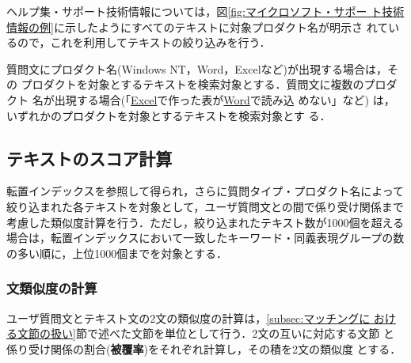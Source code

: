 ヘルプ集・サポート技術情報については，図\ref{fig:マイクロソフト・サポー
ト技術情報の例}に示したようにすべてのテキストに対象プロダクト名が明示さ
れているので，これを利用してテキストの絞り込みを行う．

質問文にプロダクト名(Windows NT，Word，Excelなど)が出現する場合は，その
プロダクトを対象とするテキストを検索対象とする．質問文に複数のプロダクト
名が出現する場合(「\underline{Excel}で作った表が\underline{Word}で読み込
めない」など) は，いずれかのプロダクトを対象とするテキストを検索対象とす
る．




\subsection{テキストのスコア計算} \label{subsec:スコアの計算}


転置インデックスを参照して得られ，さらに質問タイプ・プロダクト名によって
絞り込まれた各テキストを対象として，ユーザ質問文との間で係り受け関係まで
考慮した類似度計算を行う．ただし，絞り込まれたテキスト数が1000個を超える
場合は，転置インデックスにおいて一致したキーワード・同義表現グループの数
の多い順に，上位1000個までを対象とする．


\subsubsection{文類似度の計算}

ユーザ質問文とテキスト文の2文の類似度の計算は，\ref{subsec:マッチングに
おける文節の扱い}節で述べた文節を単位として行う．2文の互いに対応する文節
と係り受け関係の割合({\bf 被覆率})をそれぞれ計算し，その積を2文の類似度
とする．

